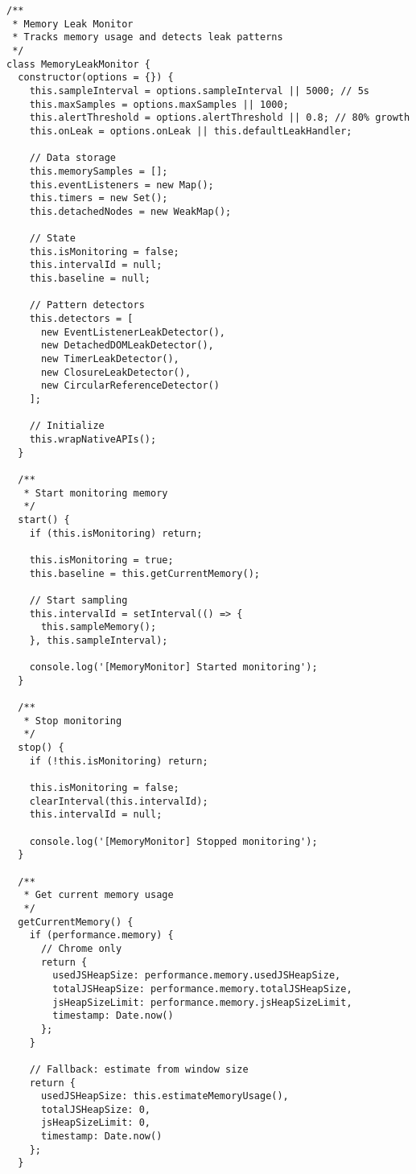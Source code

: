 \documentclass[11pt]{article}
\begin{document}
\begin{verbatim}
/**
 * Memory Leak Monitor
 * Tracks memory usage and detects leak patterns
 */
class MemoryLeakMonitor {
  constructor(options = {}) {
    this.sampleInterval = options.sampleInterval || 5000; // 5s
    this.maxSamples = options.maxSamples || 1000;
    this.alertThreshold = options.alertThreshold || 0.8; // 80% growth
    this.onLeak = options.onLeak || this.defaultLeakHandler;
    
    // Data storage
    this.memorySamples = [];
    this.eventListeners = new Map();
    this.timers = new Set();
    this.detachedNodes = new WeakMap();
    
    // State
    this.isMonitoring = false;
    this.intervalId = null;
    this.baseline = null;
    
    // Pattern detectors
    this.detectors = [
      new EventListenerLeakDetector(),
      new DetachedDOMLeakDetector(),
      new TimerLeakDetector(),
      new ClosureLeakDetector(),
      new CircularReferenceDetector()
    ];
    
    // Initialize
    this.wrapNativeAPIs();
  }
  
  /**
   * Start monitoring memory
   */
  start() {
    if (this.isMonitoring) return;
    
    this.isMonitoring = true;
    this.baseline = this.getCurrentMemory();
    
    // Start sampling
    this.intervalId = setInterval(() => {
      this.sampleMemory();
    }, this.sampleInterval);
    
    console.log('[MemoryMonitor] Started monitoring');
  }
  
  /**
   * Stop monitoring
   */
  stop() {
    if (!this.isMonitoring) return;
    
    this.isMonitoring = false;
    clearInterval(this.intervalId);
    this.intervalId = null;
    
    console.log('[MemoryMonitor] Stopped monitoring');
  }
  
  /**
   * Get current memory usage
   */
  getCurrentMemory() {
    if (performance.memory) {
      // Chrome only
      return {
        usedJSHeapSize: performance.memory.usedJSHeapSize,
        totalJSHeapSize: performance.memory.totalJSHeapSize,
        jsHeapSizeLimit: performance.memory.jsHeapSizeLimit,
        timestamp: Date.now()
      };
    }
    
    // Fallback: estimate from window size
    return {
      usedJSHeapSize: this.estimateMemoryUsage(),
      totalJSHeapSize: 0,
      jsHeapSizeLimit: 0,
      timestamp: Date.now()
    };
  }
  

\end{verbatim}
\end{document}
